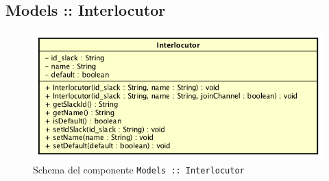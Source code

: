 \documentclass[../ManualeSviluppatore_v1.0.0.tex]{subfiles}
\begin{document}
	\newpage
	\subsection{Models :: Interlocutor}
	\begin{figure}[!h]
		\centering
		\includegraphics[scale=0.6]{Architettura/Front-End/Models/Interlocutor.png}
		\caption{Schema del componente \texttt{Models :: Interlocutor}}
	\end{figure}
\end{document}
